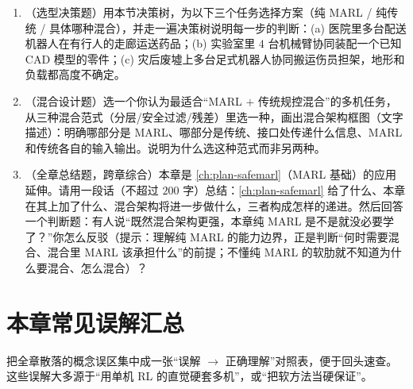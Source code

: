 \begin{practice}
\begin{enumerate}
  \item （选型决策题）用本节决策树，为以下三个任务选择方案（纯 MARL / 纯传统 / 具体哪种混合），并走一遍决策树说明每一步的判断：(a) 医院里多台配送机器人在有行人的走廊运送药品；(b) 实验室里 $4$ 台机械臂协同装配一个已知 CAD 模型的零件；(c) 灾后废墟上多台足式机器人协同搬运伤员担架，地形和负载都高度不确定。
  \item （混合设计题）选一个你认为最适合“MARL $+$ 传统规控混合”的多机任务，从三种混合范式（分层/安全过滤/残差）里选一种，画出混合架构框图（文字描述）：明确哪部分是 MARL、哪部分是传统、接口处传递什么信息、MARL 和传统各自的输入输出。说明为什么选这种范式而非另两种。
  \item （全章总结题，跨章综合）本章是 \cref{ch:plan-safemarl}（MARL 基础）的应用延伸。请用一段话（不超过 $200$ 字）总结：\cref{ch:plan-safemarl} 给了什么、本章在其上加了什么、混合架构将进一步做什么，三者构成怎样的递进。然后回答一个判断题：有人说“既然混合架构更强，本章纯 MARL 是不是就没必要学了？”你怎么反驳（提示：理解纯 MARL 的能力边界，正是判断“何时需要混合、混合里 MARL 该承担什么”的前提；不懂纯 MARL 的软肋就不知道为什么要混合、怎么混合）？
\end{enumerate}
\end{practice}

\section*{本章常见误解汇总}

把全章散落的概念误区集中成一张“误解 $\to$ 正确理解”对照表，便于回头速查。这些误解大多源于“用单机 RL 的直觉硬套多机”，或“把软方法当硬保证”。


